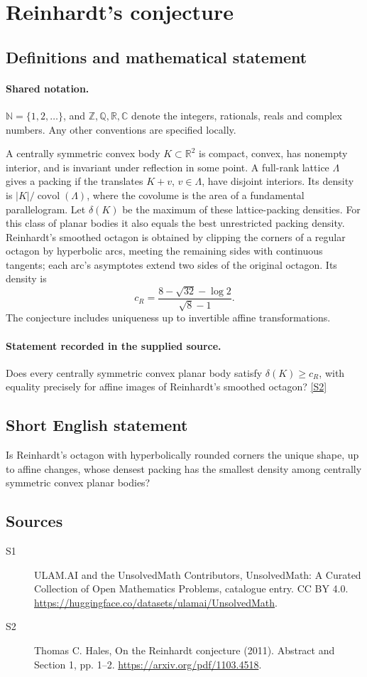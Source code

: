 \documentclass[11pt]{article}
\newcommand{\sref}[2]{\hyperlink{source:#1:#2}{[S#2]}}
\begin{document}
\section{Reinhardt's conjecture}\label{statement}

\subsection{Definitions and mathematical statement}

\paragraph{Shared notation.}$\mathbb N=\{1,2,\ldots\}$, and $\mathbb Z,\mathbb Q,\mathbb R,\mathbb C$ denote the integers, rationals, reals and complex numbers. Any other conventions are specified locally.


A centrally symmetric convex body $K\subset\mathbb R^2$ is compact, convex, has nonempty interior, and is invariant under reflection in some point. A full-rank lattice $\Lambda$ gives a packing if the translates $K+v$, $v\in\Lambda$, have disjoint interiors. Its density is $|K|/\operatorname{covol}(\Lambda)$, where the covolume is the area of a fundamental parallelogram. Let $\delta(K)$ be the maximum of these lattice-packing densities. For this class of planar bodies it also equals the best unrestricted packing density. Reinhardt's smoothed octagon is obtained by clipping the corners of a regular octagon by hyperbolic arcs, meeting the remaining sides with continuous tangents; each arc's asymptotes extend two sides of the original octagon. Its density is
\[c_R=\frac{8-\sqrt{32}-\log 2}{\sqrt8-1}.\]
The conjecture includes uniqueness up to invertible affine transformations.
\paragraph{Statement recorded in the supplied source.}
Does every centrally symmetric convex planar body satisfy $\delta(K)\geq c_R$, with equality precisely for affine images of Reinhardt's smoothed octagon? \sref{statement}{2}
\subsection{Short English statement}
Is Reinhardt’s octagon with hyperbolically rounded corners the unique shape, up to affine changes, whose densest packing has the smallest density among centrally symmetric convex planar bodies?
\subsection{Sources}
\begin{description}
\item[\hypertarget{source:statement:1}{S1}] ULAM.AI and the UnsolvedMath Contributors, UnsolvedMath: A Curated Collection of Open Mathematics Problems, catalogue entry. CC BY 4.0. \url{https://huggingface.co/datasets/ulamai/UnsolvedMath}.
\item[\hypertarget{source:statement:2}{S2}] Thomas C. Hales, On the Reinhardt conjecture (2011). Abstract and Section 1, pp. 1–2. \url{https://arxiv.org/pdf/1103.4518}.
\end{description}
\label{end:statement}
\end{document}

